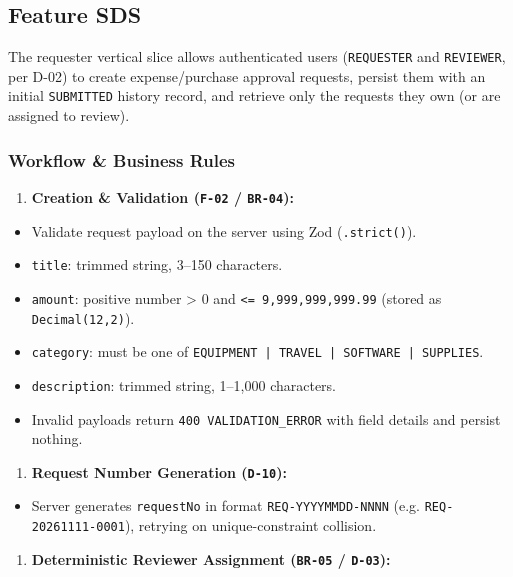 \documentclass[11pt,a4paper]{article}
\begin{document}
\subsection{Feature SDS}

The requester vertical slice allows authenticated users (\texttt{REQUESTER} and \texttt{REVIEWER}, per D-02) to create expense/purchase approval requests, persist them with an initial \texttt{SUBMITTED} history record, and retrieve only the requests they own (or are assigned to review).\\

\subsubsection{Workflow \& Business Rules}
\begin{enumerate}[leftmargin=*,itemsep=2pt,topsep=2pt]
  \item \textbf{Creation \& Validation (\texttt{F-02} / \texttt{BR-04}):}
\end{enumerate}
\begin{itemize}[leftmargin=*,itemsep=2pt,topsep=2pt]
  \item Validate request payload on the server using Zod (\texttt{.strict()}).
  \item \texttt{title}: trimmed string, 3–150 characters.
  \item \texttt{amount}: positive number > 0 and \texttt{<= 9,999,999,999.99} (stored as \texttt{Decimal(12,2)}).
  \item \texttt{category}: must be one of \texttt{EQUIPMENT | TRAVEL | SOFTWARE | SUPPLIES}.
  \item \texttt{description}: trimmed string, 1–1,000 characters.
  \item Invalid payloads return \texttt{400 VALIDATION\_ERROR} with field details and persist nothing.
\end{itemize}
\begin{enumerate}[leftmargin=*,itemsep=2pt,topsep=2pt]
  \item \textbf{Request Number Generation (\texttt{D-10}):}
\end{enumerate}
\begin{itemize}[leftmargin=*,itemsep=2pt,topsep=2pt]
  \item Server generates \texttt{requestNo} in format \texttt{REQ-YYYYMMDD-NNNN} (e.g. \texttt{REQ-20261111-0001}), retrying on unique-constraint collision.
\end{itemize}
\begin{enumerate}[leftmargin=*,itemsep=2pt,topsep=2pt]
  \item \textbf{Deterministic Reviewer Assignment (\texttt{BR-05} / \texttt{D-03}):}
\end{enumerate}
\end{document}
